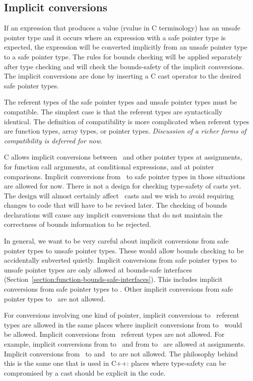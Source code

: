 \subsection{Implicit conversions}
\label{section:implicit-conversions}

If an expression that produces a value (rvalue in C terminology)
has an unsafe pointer type and it occurs where an expression with
a safe pointer type is expected, the expression will be converted implicitly 
from an unsafe pointer type to a safe pointer type.  The rules for bounds checking will
be applied separately after type  checking and will check
the bounds-safety of the implicit conversions.  The implicit conversions are
done by inserting a C cast operator to the desired safe pointer types. 

The referent types of the safe pointer types and unsafe pointer types
must be compatible.  The simplest case is that the referent types are
syntactically identical.  The definition of compatibility is more
complicated when referent types are function types, array types, or
pointer types. {\em Discussion of a richer forms of compatibility
is deferred for now}.

C allows implicit conversions between \unsafeptrvoid\ and other pointer
types at assignments, for function call arguments, at conditional expressions,
and at pointer comparisons. Implicit conversions from \unsafeptrvoid\ to safe pointer
types in those situations are allowed for now.  There is not a design for
checking type-safety  of casts yet.   The design will almost certainly affect
\unsafeptrvoid\ casts and we wish to avoid requiring changes to code that will 
have to be revised later.  The checking of bounds declarations will cause
any implicit conversions that do not maintain the correctness of bounds
information to be rejected.

In general, we want to be very careful about implicit conversions from safe pointer
types to unsafe pointer types.  These would allow bounds checking to be accidentally
subverted quietly. Implicit conversions from safe pointer types to unsafe 
pointer types are only allowed at bounds-safe interfaces
(Section~\ref{section:function-bounds-safe-interfaces}).  This includes
implicit conversions from safe pointer types to \unsafeptrvoid.  Other implicit
conversions from safe pointer types to \unsafeptrvoid\ are not allowed.

For conversions involving one kind of pointer, implicit conversions to \void\ referent
types are allowed in the same places where implicit conversions from 
to \unsafeptrvoid\ would be allowed.  Implicit conversions from \void\ referent types
are not allowed.  For example, implicit conversions from  to \ptrvoid\ and
from  to \arrayptrvoid\ are allowed at assignments.   Implicit
conversions from \ptrvoid\ to  and \arrayptrvoid\ to 
are not allowed.  The philosophy behind this is the same one that is used in C++:
places where type-safety can be compromised by a cast should be explicit in the code.

